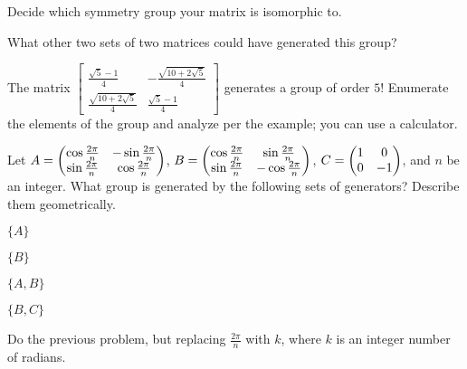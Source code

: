 \documentclass[../gatm_answers.tex]{subfiles}
\begin{document}
\begin{iinner_problem}
\item Decide which symmetry group your matrix is isomorphic to.
\end{iinner_problem}

\begin{iinner_problem}
\item What other two sets of two matrices could have generated this group?
\end{iinner_problem}

\begin{outer_problem}
\item The matrix $\left[\begin{array}{cc} \frac{\sqrt{5}-1}{4} & -\frac{\sqrt{10+2\sqrt{5}}}{4} \\ \frac{\sqrt{10+2\sqrt{5}}}{4} & \frac{\sqrt{5}-1}{4} \end{array}\right]$ generates a group of order $5$! Enumerate the elements of the group and analyze per the example; you can use a calculator.
\end{outer_problem}

\begin{outer_problem}
\item Let $A=\begin{pmatrix} \cos\frac{2\pi}{n} & -\sin\frac{2\pi}{n} \\ \sin\frac{2\pi}{n} & \cos\frac{2\pi}{n} \end{pmatrix}$, $B=\begin{pmatrix} \cos\frac{2\pi}{n} & \sin\frac{2\pi}{n} \\ \sin\frac{2\pi}{n} & -\cos\frac{2\pi}{n} \end{pmatrix}$, $C=\begin{pmatrix} 1 & 0 \\ 0 & -1 \end{pmatrix}$, and $n$ be an integer. What group is generated by the following sets of generators? Describe them geometrically.
\end{outer_problem}

\begin{inner_problem}[start=1]
\item $\{A\}$
\end{inner_problem}

\begin{inner_problem}
\item $\{B\}$
\end{inner_problem}

\begin{inner_problem}
\item $\{A,B\}$
\end{inner_problem}

\begin{inner_problem}
\item $\{B,C\}$
\end{inner_problem}

\begin{outer_problem}
\item Do the previous problem, but replacing $\frac{2\pi}{n}$ with $k$, where $k$ is an integer number of radians.
\end{outer_problem}
\end{document}

